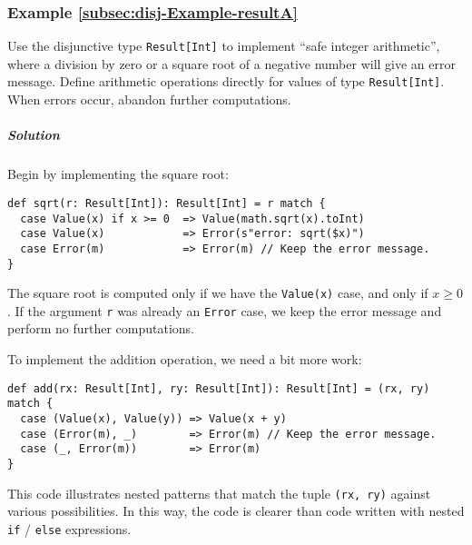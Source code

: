 \subsubsection{Example \label{subsec:disj-Example-resultA}\ref{subsec:disj-Example-resultA}}

Use the disjunctive type \lstinline!Result[Int]! to implement ``safe
integer arithmetic'', where a division by zero or a square root of
a negative number will give an error message. Define arithmetic operations
directly for values of type \lstinline!Result[Int]!. When errors
occur, abandon further computations.

\subparagraph{Solution}

Begin by implementing the square root:
\begin{lstlisting}
def sqrt(r: Result[Int]): Result[Int] = r match {
  case Value(x) if x >= 0  => Value(math.sqrt(x).toInt)
  case Value(x)            => Error(s"error: sqrt($x)")
  case Error(m)            => Error(m) // Keep the error message.
}
\end{lstlisting}
The square root is computed only if we have the \lstinline!Value(x)!
case, and only if $x\geq0$. If the argument \lstinline!r! was already
an \lstinline!Error! case, we keep the error message and perform
no further computations.

To implement the addition operation, we need a bit more work:
\begin{lstlisting}
def add(rx: Result[Int], ry: Result[Int]): Result[Int] = (rx, ry) match {
  case (Value(x), Value(y)) => Value(x + y)
  case (Error(m), _)        => Error(m) // Keep the error message.
  case (_, Error(m))        => Error(m)
}
\end{lstlisting}
This code illustrates nested patterns that match the tuple \lstinline!(rx, ry)!
against various possibilities. In this way, the code is clearer than
code written with nested \lstinline!if! / \lstinline!else! expressions.

